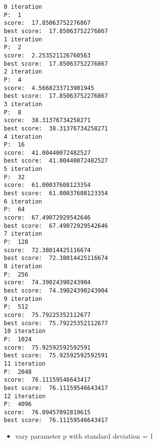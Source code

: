 \documentclass[11pt]{article}
\providecommand{\tightlist}{%
      \setlength{\itemsep}{0pt}\setlength{\parskip}{0pt}}
\begin{document}
    \begin{Verbatim}[commandchars=\\\{\}]
0 iteration
P:  1
score:  17.85063752276867
best score:  17.85063752276867
1 iteration
P:  2
score:  2.253521126760563
best score:  17.85063752276867
2 iteration
P:  4
score:  4.5668233713901945
best score:  17.85063752276867
3 iteration
P:  8
score:  38.31376734258271
best score:  38.31376734258271
4 iteration
P:  16
score:  41.00440072482527
best score:  41.00440072482527
5 iteration
P:  32
score:  61.00037608123354
best score:  61.00037608123354
6 iteration
P:  64
score:  67.49072929542646
best score:  67.49072929542646
7 iteration
P:  128
score:  72.38014425116674
best score:  72.38014425116674
8 iteration
P:  256
score:  74.39024390243904
best score:  74.39024390243904
9 iteration
P:  512
score:  75.79225352112677
best score:  75.79225352112677
10 iteration
P:  1024
score:  75.92592592592591
best score:  75.92592592592591
11 iteration
P:  2048
score:  76.11159546643417
best score:  76.11159546643417
12 iteration
P:  4096
score:  76.09457092819615
best score:  76.11159546643417

    \end{Verbatim}

    \begin{itemize}
\tightlist
\item
  vary parameter p with standard deviation = 1
\end{itemize}
\end{document}
